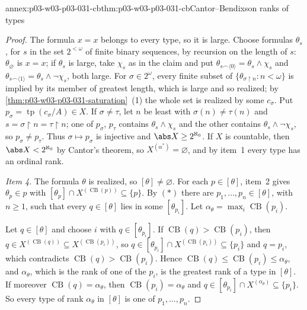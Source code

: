 \begin{annexitem}{annex:p03-w03-p03-031-cb}{thm:p03-w03-p03-031-cb}{Cantor--Bendixson ranks of types}
\begin{proof}
The formula \(x=x\) belongs to every type, so it is large.  Choose formulas
\(\theta_s\), for \(s\) in the set \(2^{<\omega}\) of finite binary
sequences, by recursion on the length of \(s\): \(\theta_\varnothing\) is
\(x=x\); if \(\theta_s\) is large, take \(\chi_s\) as in the claim and put
\(\theta_{s\frown\langle0\rangle}=\theta_s\wedge\chi_s\) and
\(\theta_{s\frown\langle1\rangle}=\theta_s\wedge\neg\chi_s\), both large.
For \(\sigma\in2^\omega\), every finite subset of
\(\{\theta_{\sigma\mathbin{\upharpoonright}n}:n<\omega\}\) is implied by its
member of greatest length, which is large and so realized; by
\cref{thm:p03-w03-p03-031-saturation}~(1) the whole set is realized by some
\(c_\sigma\).  Put \(p_\sigma=\operatorname{tp}(c_\sigma/A)\in X\).  If
\(\sigma\neq\tau\), let \(n\) be least with \(\sigma(n)\neq\tau(n)\) and
\(s=\sigma\mathbin{\upharpoonright}n=\tau\mathbin{\upharpoonright}n\); one of
\(p_\sigma\), \(p_\tau\) contains \(\theta_s\wedge\chi_s\) and the other
contains \(\theta_s\wedge\neg\chi_s\), so \(p_\sigma\neq p_\tau\).  Thus
\(\sigma\mapsto p_\sigma\) is injective and \(\abs X\geq2^{\aleph_0}\).
If \(X\) is countable, then \(\abs X<2^{\aleph_0}\) by Cantor's theorem, so
\(X^{(\alpha^*)}=\varnothing\), and by item~1 every type has an ordinal
rank.

\emph{Item 4.}  The formula \(\theta\) is realized, so \([\theta]\neq
\varnothing\).  For each \(p\in[\theta]\), item~2 gives \(\theta_p\in p\)
with \([\theta_p]\cap X^{(\operatorname{CB}(p))}\subseteq\{p\}\).  By
\((\ast)\) there are \(p_1,\ldots,p_n\in[\theta]\), with \(n\geq1\), such
that every \(q\in[\theta]\) lies in some \([\theta_{p_i}]\).  Let
\(\alpha_\theta=\max_i\operatorname{CB}(p_i)\).

Let \(q\in[\theta]\) and choose \(i\) with \(q\in[\theta_{p_i}]\).  If
\(\operatorname{CB}(q)>\operatorname{CB}(p_i)\), then \(q\in
X^{(\operatorname{CB}(q))}\subseteq X^{(\operatorname{CB}(p_i))}\), so
\(q\in[\theta_{p_i}]\cap X^{(\operatorname{CB}(p_i))}\subseteq\{p_i\}\) and
\(q=p_i\), which contradicts \(\operatorname{CB}(q)>\operatorname{CB}(p_i)\).
Hence \(\operatorname{CB}(q)\leq\operatorname{CB}(p_i)\leq\alpha_\theta\),
and \(\alpha_\theta\), which is the rank of one of the \(p_i\), is the
greatest rank of a type in \([\theta]\).  If moreover
\(\operatorname{CB}(q)=\alpha_\theta\), then
\(\operatorname{CB}(p_i)=\alpha_\theta\) and \(q\in[\theta_{p_i}]\cap
X^{(\alpha_\theta)}\subseteq\{p_i\}\).  So every type of rank
\(\alpha_\theta\) in \([\theta]\) is one of \(p_1,\ldots,p_n\).
\end{proof}
\end{annexitem}

